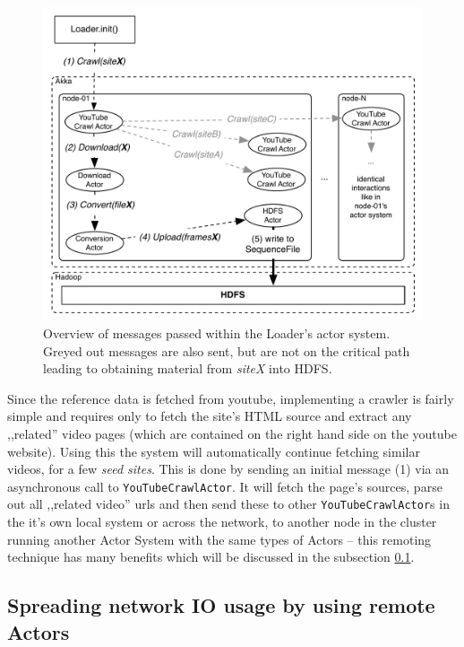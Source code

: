 \begin{figure}[ch!]
  \centering
  \includegraphics[scale=0.9]{./diagrams/loader-high-level.pdf}
  \caption{Overview of messages passed within the Loader's actor system. Greyed out messages are also sent, but are not on the critical path leading to obtaining material from \textit{siteX} into HDFS.}
  \label{fig:high-level-loader}
\end{figure}

Since the reference data is fetched from youtube, implementing a crawler is fairly simple and requires only to fetch the site's HTML source and extract any ,,related'' video pages (which are contained on the right hand side on the youtube website). Using this the system will automatically continue fetching similar videos, for a few \textit{seed sites}. This is done by sending an initial message (1) via an asynchronous call to \verb|YouTubeCrawlActor|. It will fetch the page's sources, parse out all ,,related video'' urls and then send these to other \verb|YouTubeCrawlActor|s in the it's own local system or across the network, to another node in the cluster running another Actor System with the same types of Actors -- this remoting technique has many benefits which will be discussed in the subsection \ref{sec:location-transparency}.



\subsection{Spreading network IO usage by using remote Actors}
\label{sec:location-transparency}


